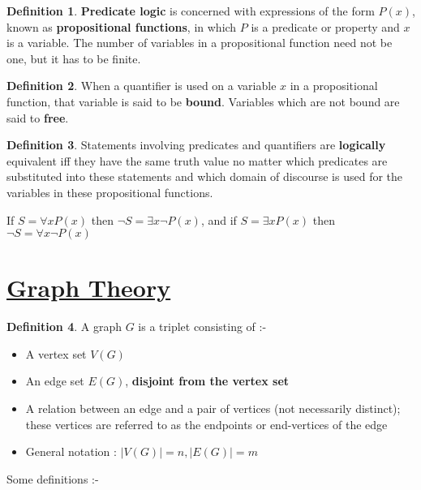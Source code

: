 \documentclass{article}
\theoremstyle{definition}
\newtheorem*{defi}{Definition}
\theoremstyle{definition}
\theoremstyle{named}
\begin{document}
\begin{defi}
    \textbf{Predicate logic} is concerned with
expressions of the form $P(x)$, known as
\textbf{propositional functions}, in which $P$ is a predicate or
property and $x$ is a variable. The number of variables
in a propositional function need not be one, but it
has to be finite.
\end{defi}

\begin{defi}
    When a quantifier is used on a variable
$x$ in a propositional function, that variable is said to
be \textbf{bound}. Variables which are not bound are said to \textbf{free}.
\end{defi}
\begin{defi}
    Statements involving predicates and
quantifiers are \textbf{logically} equivalent iff they have the
same truth value no matter which predicates are
substituted into these statements and which domain
of discourse is used for the variables in these
propositional functions.
\end{defi}

    If $S = \forall x P(x)$ then $\neg S = \exists x \neg P(x)$,  and 
if $S = \exists x P(x)$ then $\neg S = \forall x \neg P(x)$

\section{\underline{Graph Theory}}

\begin{defi}
    A graph $G$ is a triplet consisting of :-
    \begin{itemize}
        \item A vertex set $V(G)$
        \item An edge set $E(G)$, \textbf{disjoint from the vertex set}
        \item A relation between an edge and a pair of vertices (not
necessarily distinct); these vertices are referred to as the
endpoints or end-vertices of the edge
        \item General notation : $|V(G)| = n, |E(G)| = m$
    \end{itemize}
\end{defi}

Some definitions :-
\end{document}

